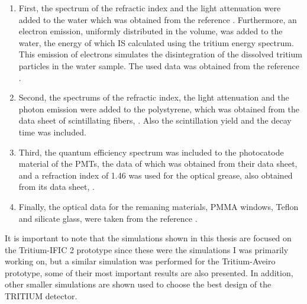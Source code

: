 \begin{enumerate}

\item{} First, the spectrum of the refractic index and the light attenuation were added to the water which was obtained from the reference \cite{WaterPropertiesSimulation}. Furthermore, an electron emission, uniformly distributed in the volume, was added to the water, the energy of which IS calculated using the tritium energy spectrum. This emission of electrons simulates the disintegration of the dissolved tritium particles in the water sample. The used data was obtained from the reference \cite{TritiumEmissionSpectrum}.

\item{} Second, the spectrums of the refractic index, the light attenuation and the photon emission were added to the polystyrene, which was obtained from the data sheet of scintillating fibers, \cite{DataSheetBCF12Fiber}.  Also the scintillation yield and the decay time was included. 

\item{} Third, the quantum efficiency spectrum was included to the photocatode material of the PMTs, the data of which was obtained from their data sheet, \cite{DataSheetPMTs} and a refraction index of 1.46 was used for the optical grease, also obtained from its data sheet, \cite{OpticalGrease}.

\item{} Finally, the optical data for the remaning materials, PMMA windows, Teflon and silicate glass, were taken from the reference \cite{NEMODataSimulation}.

\end{enumerate} 

It is important to note that the simulations shown in this thesis are focused on the Tritium-IFIC 2 prototype since these were the simulations I was primarily working on, but a similar simulation was performed for the Tritium-Aveiro prototype, some of their most important results are also presented. In addition, other smaller simulations are shown used to choose the best design of the TRITIUM detector.